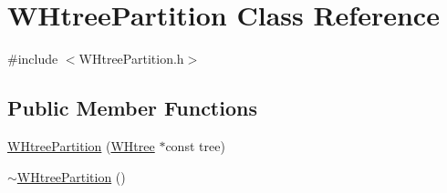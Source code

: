 \hypertarget{classWHtreePartition}{\section{\-W\-Htree\-Partition \-Class \-Reference}
\label{classWHtreePartition}
}


{\ttfamily \#include $<$\-W\-Htree\-Partition.\-h$>$}

\subsection*{\-Public \-Member \-Functions}
\begin{DoxyCompactItemize}
\item 
\hyperlink{classWHtreePartition_a1c16d2118b3528ac8b63259ee246b9f4}{\-W\-Htree\-Partition} (\hyperlink{classWHtree}{\-W\-Htree} $\ast$const tree)
\item 
\hypertarget{classWHtreePartition_af86d3bc059ffd4d1c7cfdd830ca1d2c2}{\hyperlink{classWHtreePartition_af86d3bc059ffd4d1c7cfdd830ca1d2c2}{$\sim$\-W\-Htree\-Partition} ()}\label{classWHtreePartition_af86d3bc059ffd4d1c7cfdd830ca1d2c2}


\end{DoxyCompactItemize}
